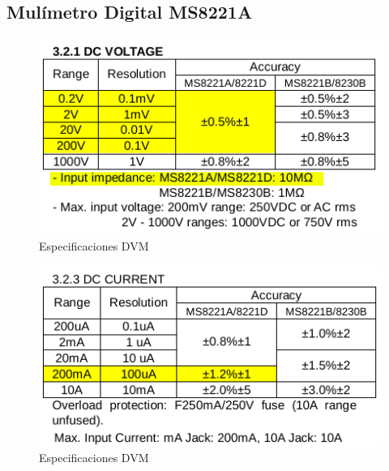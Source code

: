 \documentclass[12pt,a4paper]{article}
\begin{document}
		\subsection{Mulímetro Digital MS8221A}
		\begin{figure}[H]
			\centering
				\includegraphics[scale=1.5]{attachments/dvm_specs.pdf}\caption{Especificaciones DVM}
			\end{figure}

		\begin{figure}[H]
			\centering
				\includegraphics[scale=1.5]{attachments/dvm_specs1.pdf}\caption{Especificaciones DVM}
			\end{figure}
\end{document}
